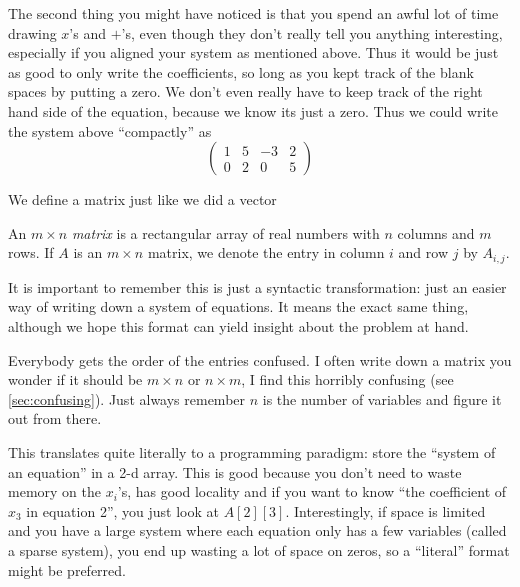 \documentclass[Main.tex]{subfiles}
\begin{document}
The second thing you might have noticed is that you spend an awful lot of time drawing $x$'s and $+$'s, even though they don't really tell you anything interesting, especially if you aligned your system as mentioned above.
Thus it would be just as good to only write the coefficients, so long as you kept track of the blank spaces by putting a zero.
We don't even really have to keep track of the right hand side of the equation, because we know its just a zero.  
Thus we could write the system above ``compactly'' as
\[\left(\begin{array}{cccc}
  1 & 5 & -3 &  2\\
  0 & 2 & 0  &  5
\end{array}\right)\]

We define a matrix just like we did a vector
\begin{Def}[Matrix]
  An $m\times n$ \emph{matrix} is a rectangular array of real numbers with $n$ columns and $m$ rows.  
  If $A$ is an $m\times n$ matrix, we denote the entry in column $i$ and row $j$ by $A_{i,j}$.
\end{Def}

\begin{Remark}
  It is important to remember this is just a syntactic transformation: just an easier way of writing down a system of equations.
  It means the exact same thing, although we hope this format can yield insight about the problem at hand.   
\end{Remark}

\begin{Remark}
  Everybody gets the order of the entries confused. 
  I often write down a matrix you wonder if it should be $m\times n$ or $n\times m$, I find this horribly confusing (see \ref{sec:confusing}).
  Just always remember $n$ is the number of variables and figure it out from there.  
\end{Remark}

\begin{RemarkProg}
  This translates quite literally to a programming paradigm: store the ``system of an equation'' in a 2-d array.  
  This is good because you don't need to waste memory on the $x_i$'s, has good locality and if you want to know ``the coefficient of $x_3$ in equation 2'', you just look at $A[2][3]$. 
  Interestingly, if space is limited and you have a large system where each equation only has a few variables (called a sparse system), you end up wasting a lot of space on zeros, so a ``literal'' format might be preferred.  
\end{RemarkProg}
\end{document}
